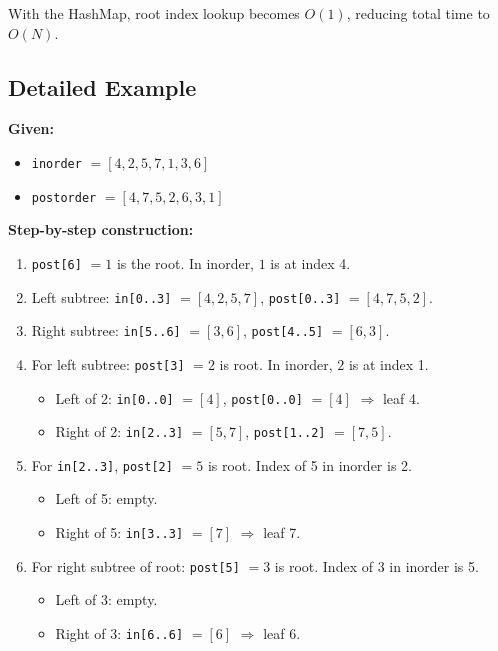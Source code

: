 \documentclass[10pt,journal,compsoc,onecolumn]{IEEEtran}
\begin{document}
With the HashMap, root index lookup becomes $O(1)$, reducing total time to $O(N)$.

\subsection{Detailed Example}

\textbf{Given:}
\begin{itemize}
    \item \texttt{inorder}  $= [4, 2, 5, 7, 1, 3, 6]$
    \item \texttt{postorder} $= [4, 7, 5, 2, 6, 3, 1]$
\end{itemize}

\textbf{Step-by-step construction:}

\begin{enumerate}
    \item \texttt{post[6]} $= 1$ is the root. In inorder, $1$ is at index 4.
    \item Left subtree: \texttt{in[0..3]} $= [4,2,5,7]$, \texttt{post[0..3]} $= [4,7,5,2]$.
    \item Right subtree: \texttt{in[5..6]} $= [3,6]$, \texttt{post[4..5]} $= [6,3]$.
    \item For left subtree: \texttt{post[3]} $= 2$ is root. In inorder, $2$ is at index 1.
    \begin{itemize}
        \item Left of 2: \texttt{in[0..0]} $= [4]$, \texttt{post[0..0]} $= [4]$ $\Rightarrow$ leaf 4.
        \item Right of 2: \texttt{in[2..3]} $= [5,7]$, \texttt{post[1..2]} $= [7,5]$.
    \end{itemize}
    \item For \texttt{in[2..3]}, \texttt{post[2]} $= 5$ is root. Index of 5 in inorder is 2.
    \begin{itemize}
        \item Left of 5: empty.
        \item Right of 5: \texttt{in[3..3]} $= [7]$ $\Rightarrow$ leaf 7.
    \end{itemize}
    \item For right subtree of root: \texttt{post[5]} $= 3$ is root. Index of 3 in inorder is 5.
    \begin{itemize}
        \item Left of 3: empty.
        \item Right of 3: \texttt{in[6..6]} $= [6]$ $\Rightarrow$ leaf 6.
    \end{itemize}
\end{enumerate}
\end{document}
